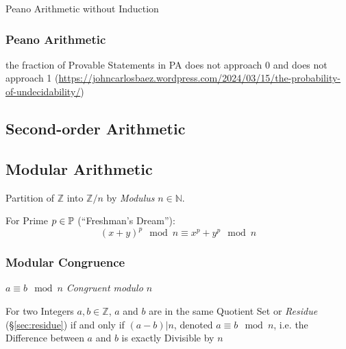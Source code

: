 Peano Arithmetic without Induction



\subsubsection{Peano Arithmetic}\label{sec:peano_arithmetic}

the fraction of Provable Statements in PA does not approach 0 and does not
approach 1
(\url{https://johncarlosbaez.wordpress.com/2024/03/15/the-probability-of-undecidability/})



\subsection{Second-order Arithmetic}\label{sec:second_order_arithmetic}

\subsection{Modular Arithmetic}\label{sec:modular_arithmetic}

Partition of $\mathbb{Z}$ into $\mathbb{Z}/n$ by \emph{Modulus} $n \in
\mathbb{N}$.

For Prime $p \in \mathbb{P}$ (``Freshman's Dream''):
\[
  (x+y)^p \mod n \equiv x^p + y^p \mod n
\]



\subsubsection{Modular Congruence}\label{sec:modular_congruence}

$a \equiv b \mod n$ \emph{Congruent modulo $n$}

For two Integers $a,b \in \mathbb{Z}$, $a$ and $b$ are in the same
Quotient Set or \emph{Residue} (\S\ref{sec:residue}) if and only if
$(a - b)|n$, denoted $a \equiv b \mod n$, i.e. the Difference between $a$ and
$b$ is exactly Divisible by $n$

